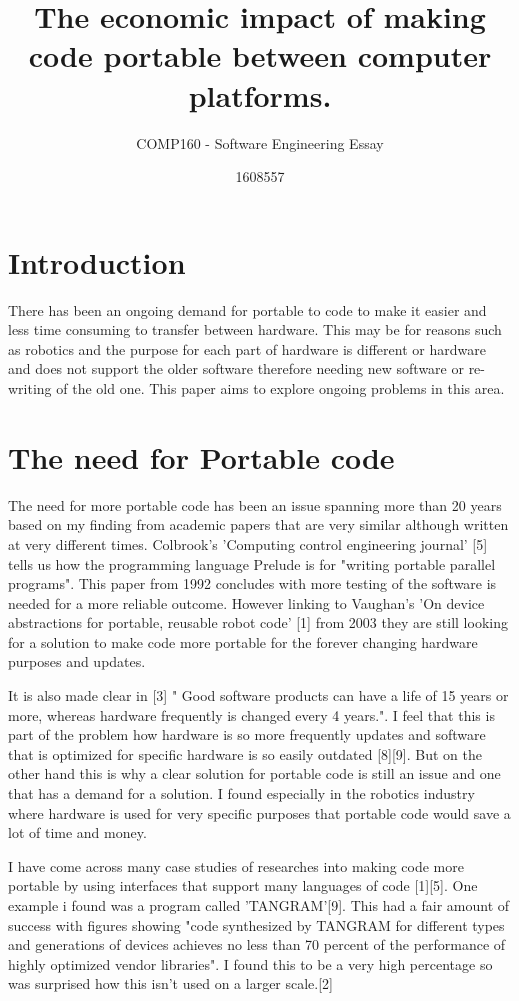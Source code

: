 \documentclass{scrartcl}
\title{The economic impact of making code portable between computer platforms.}
\subtitle{COMP160 - Software Engineering Essay}
\author{1608557}
\begin{document}
\maketitle 

\section{Introduction}
There has been an ongoing demand for portable to code to make it easier and less time consuming to transfer between hardware. This may be for reasons such as robotics and the purpose for each part of hardware is different or hardware and does not support the older software therefore needing new software or re-writing of the old one. This paper aims to explore ongoing problems in this area. 

\section{The need for Portable code}

The need for more portable code has been an issue spanning more than 20 years based on my finding from academic papers that are very similar although written at very different times. Colbrook's 'Computing control engineering journal' [5] tells us how the programming language Prelude is for "writing portable parallel programs". This paper from 1992 concludes with more testing of the software is needed for a more reliable outcome. However linking to Vaughan's 'On device abstractions for portable, reusable robot code' [1] from 2003 they are still looking for a solution to make code more portable for the forever changing hardware purposes and updates. 

It is also made clear in [3] " Good software products can have a life of 15 years
or more, whereas hardware frequently is changed every 4 years.". I feel that this is part of the problem how hardware is so more frequently updates and software that is optimized for specific hardware is so easily outdated [8][9]. But on the other hand this is why a clear solution for portable code is still an issue and one that has a demand for a solution. I found especially in the robotics industry where hardware is used for very specific purposes that portable code would save a lot of time and money. 

I have come across many case studies of researches into making code more portable by using interfaces that support many languages of code [1][5]. One example i found was a program called 'TANGRAM'[9]. This had a fair amount of success with figures showing "code synthesized by TANGRAM for different types and generations of devices achieves no less than 70 percent of the performance of highly optimized vendor libraries". I found this to be a very high percentage so was surprised how this isn't used on a larger scale.[2]
\end{document}
